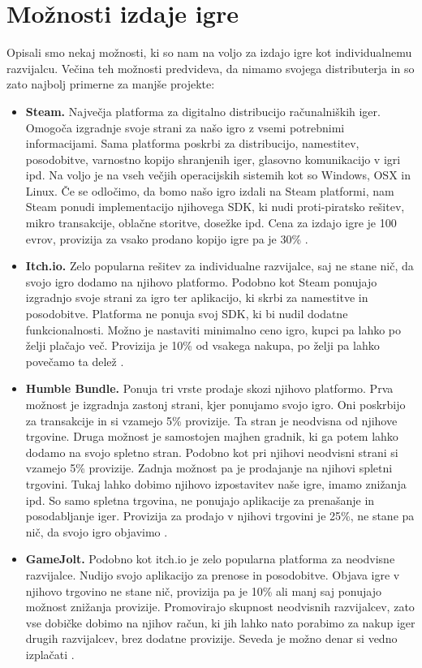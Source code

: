 \documentclass[12pt,a4paper,twoside]{book}
\begin{document}
\section{Možnosti izdaje igre}
Opisali smo nekaj možnosti, ki so nam na voljo za izdajo igre kot individualnemu razvijalcu. Večina teh možnosti predvideva, da nimamo svojega distributerja in so zato najbolj primerne za manjše projekte:
\begin{itemize}
	\item \textbf{Steam.} Največja platforma za digitalno distribucijo računalniških iger. Omogoča izgradnje svoje strani za našo igro z vsemi potrebnimi informacijami. Sama platforma poskrbi za distribucijo, namestitev, posodobitve, varnostno kopijo shranjenih iger, glasovno komunikacijo v igri ipd. Na voljo je na vseh večjih operacijskih sistemih kot so Windows, OSX in Linux. Če se odločimo, da bomo našo igro izdali na Steam platformi, nam Steam ponudi implementacijo njihovega SDK, ki nudi proti-piratsko rešitev, mikro transakcije, oblačne storitve, dosežke ipd. Cena za izdajo igre je 100 evrov, provizija za vsako prodano kopijo igre pa je 30\% \cite{steam}.
	\item \textbf{Itch.io.} Zelo popularna rešitev za individualne razvijalce, saj ne stane nič, da svojo igro dodamo na njihovo platformo. Podobno kot Steam ponujajo izgradnjo svoje strani za igro ter aplikacijo, ki skrbi za namestitve in posodobitve. Platforma ne ponuja svoj SDK, ki bi nudil dodatne funkcionalnosti. Možno je nastaviti minimalno ceno igro, kupci pa lahko po želji plačajo več. Provizija je 10\% od vsakega nakupa, po želji pa lahko povečamo ta delež \cite{itchiofaq}.
	\item \textbf{Humble Bundle.} Ponuja tri vrste prodaje skozi njihovo platformo. Prva možnost je izgradnja zastonj strani, kjer ponujamo svojo igro. Oni poskrbijo za transakcije in si vzamejo 5\% provizije. Ta stran je neodvisna od njihove trgovine. Druga možnost je samostojen majhen gradnik, ki ga potem lahko dodamo na svojo spletno stran. Podobno kot pri njihovi neodvisni strani si vzamejo 5\% provizije. Zadnja možnost pa je prodajanje na njihovi spletni trgovini. Tukaj lahko dobimo njihovo izpostavitev naše igre, imamo znižanja ipd. So samo spletna trgovina, ne ponujajo aplikacije za prenašanje in posodabljanje iger. Provizija za prodajo v njihovi trgovini je 25\%, ne stane pa nič, da svojo igro objavimo \cite{humblebundle}.
	\item \textbf{GameJolt.} Podobno kot itch.io je zelo popularna platforma za neodvisne razvijalce. Nudijo svojo aplikacijo za prenose in posodobitve. Objava igre v njihovo trgovino ne stane nič, provizija pa je 10\% ali manj saj ponujajo možnost znižanja provizije. Promovirajo skupnost neodvisnih razvijalcev, zato vse dobičke dobimo na njihov račun, ki jih lahko nato porabimo za nakup iger drugih razvijalcev, brez dodatne provizije. Seveda je možno denar si vedno izplačati \cite{gamejolt}.

\end{itemize}
\end{document}
